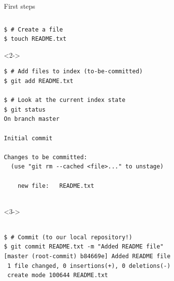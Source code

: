 \begin{frame}[fragile]{First steps}
	\begin{columns}
		\begin{column}{0.6\textwidth}
			\begin{lstlisting}
$ # Create a file
$ touch README.txt
			\end{lstlisting}
			\begin{onlyenv}<2->
			\begin{lstlisting}
$ # Add files to index (to-be-committed)
$ git add README.txt

$ # Look at the current index state
$ git status
On branch master

Initial commit

Changes to be committed:
  (use "git rm --cached <file>..." to unstage)

	new file:   README.txt


			\end{lstlisting}
			\end{onlyenv}
			\begin{onlyenv}<3->
			\begin{lstlisting}

$ # Commit (to our local repository!)
$ git commit README.txt -m "Added README file"
[master (root-commit) b84669e] Added README file
 1 file changed, 0 insertions(+), 0 deletions(-)
 create mode 100644 README.txt

			\end{lstlisting}
			\end{onlyenv}
			

\end{column}
\end{columns}
\end{frame}
